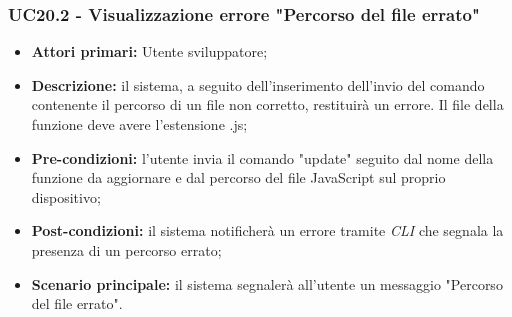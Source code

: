\subsubsection{UC20.2 - Visualizzazione errore "Percorso del file errato"}
\begin{itemize}
	\item \textbf{Attori primari:} Utente sviluppatore;
	\item \textbf{Descrizione:} il sistema, a seguito dell'inserimento dell'invio del comando contenente il percorso di un file non corretto, restituirà un errore. Il file della funzione deve avere l'estensione .js;
	\item \textbf{Pre-condizioni:}  l'utente invia il comando "update" seguito dal nome della funzione da aggiornare e dal percorso del file JavaScript sul proprio dispositivo;
	\item \textbf{Post-condizioni:} il sistema notificherà un errore tramite \textit{CLI\glo} che segnala la presenza di un percorso errato;
	\item \textbf{Scenario principale:} il sistema segnalerà all'utente un messaggio "Percorso del file errato".
\end{itemize}
